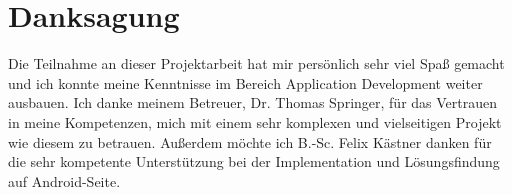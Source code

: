 \section{Danksagung}

Die Teilnahme an dieser Projektarbeit hat mir persönlich sehr viel Spaß gemacht und ich konnte meine Kenntnisse im Bereich Application Development weiter ausbauen. Ich danke meinem Betreuer, Dr. Thomas Springer, für das Vertrauen in meine Kompetenzen, mich mit einem sehr komplexen und vielseitigen Projekt wie diesem zu betrauen. Außerdem möchte ich B.-Sc. Felix Kästner danken für die sehr kompetente Unterstützung bei der Implementation und Lösungsfindung auf Android-Seite.
